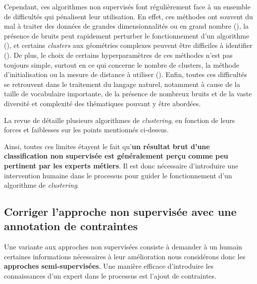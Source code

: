 		Cependant, ces algorithmes non supervisés font régulièrement face à un ensemble de difficultés qui pénalisent leur utilisation.
		En effet, ces méthodes ont souvent du mal à traiter des données de grandes dimensionnalités ou en grand nombre (\cite{steinbach-etal:2004:challenges-clustering-high}), la présence de bruits peut rapidement perturber le fonctionnement d'un algorithme (\cite{yang-wang:2004:competitive-algorithms-clustering}), et certains \textit{clusters} aux géométries complexes peuvent être difficiles à identifier (\cite{kriegel-etal:2011:density-based-clustering}).
		De plus, le choix de certains hyperparamètres de ces méthodes n'est pas toujours simple, surtout en ce qui concerne le nombre de clusters, la méthode d'initialisation ou la mesure de distance à utiliser (\cite{agarwal-etal:2011:issues-challenges-tools}).
		Enfin, toutes ces difficultés se retrouvent dans le traitement du langage naturel, notamment à cause de la taille de vocabulaire importante, de la présence de nombreux bruits et de la vaste diversité et complexité des thématiques pouvant y être abordées.
		\begin{leftBarInformation}
			La revue de \cite{xu-tian:2015:comprehensive-survey-clustering} détaille plusieurs algorithmes de \textit{clustering}, en fonction de leurs forces et faiblesses sur les points mentionnés ci-dessus.
		\end{leftBarInformation}
		
		Ainsi, toutes ces limites étayent le fait qu'\textbf{un résultat brut d'une classification non supervisée est généralement perçu comme peu pertinent par les experts métiers}.
		Il est donc nécessaire d'introduire une intervention humaine dans le processus pour guider le fonctionnement d'un algorithme de \textit{clustering}.
		
	
	\subsection{Corriger l'approche non supervisée avec une annotation de contraintes}
	\label{section:3.1.2-INTUITIONS-ORIGINES-SEMI-SUPERVISEES}
	
		Une variante aux approches non supervisées consiste à demander à un humain certaines informations nécessaires à leur amélioration nous considérons donc les \textbf{approches semi-supervisées}.
		Une manière efficace d'introduire les connaissances d'un expert dans le processus est l'ajout de contraintes.
		
